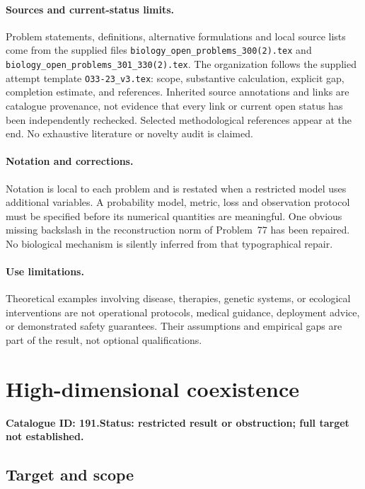 \documentclass[11pt]{article}
\begin{document}
\paragraph{Sources and current-status limits.}
Problem statements, definitions, alternative formulations and local source lists
come from the supplied files
\texttt{biology\_open\_problems\_300(2).tex} and
\texttt{biology\_open\_problems\_301\_330(2).tex}.
The organization follows the supplied attempt template
\texttt{O33-23\_v3.tex}: scope, substantive calculation, explicit gap,
completion estimate, and references. Inherited source annotations and links are
catalogue provenance, not evidence that every link or current open status has
been independently rechecked. Selected methodological references appear at the
end. No exhaustive literature or novelty audit is claimed.

\paragraph{Notation and corrections.}
Notation is local to each problem and is restated when a restricted model uses
additional variables. A probability model, metric, loss and observation protocol
must be specified before its numerical quantities are meaningful. One obvious
missing backslash in the reconstruction norm of Problem~77 has been repaired.
No biological mechanism is silently inferred from that typographical repair.

\paragraph{Use limitations.}
Theoretical examples involving disease, therapies, genetic systems, or ecological
interventions are not operational protocols, medical guidance, deployment advice,
or demonstrated safety guarantees. Their assumptions and empirical gaps are part
of the result, not optional qualifications.

\setcounter{section}{190}
\section{High-dimensional coexistence}
\label{prob:191}
\noindent\textbf{Catalogue ID: 191.}\quad \textbf{Status: restricted result or obstruction; full target not established.}
\subsection{Target and scope}
\end{document}

